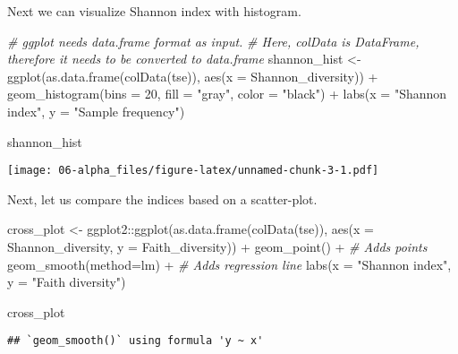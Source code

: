 \documentclass[
  oneside]{book}
\newenvironment{Shaded}{\begin{snugshade}}{\end{snugshade}}
\newcommand{\AttributeTok}[1]{\textcolor[rgb]{0.77,0.63,0.00}{#1}}
\newcommand{\CommentTok}[1]{\textcolor[rgb]{0.56,0.35,0.01}{\textit{#1}}}
\newcommand{\DecValTok}[1]{\textcolor[rgb]{0.00,0.00,0.81}{#1}}
\newcommand{\FunctionTok}[1]{\textcolor[rgb]{0.00,0.00,0.00}{#1}}
\newcommand{\NormalTok}[1]{#1}
\newcommand{\OtherTok}[1]{\textcolor[rgb]{0.56,0.35,0.01}{#1}}
\newcommand{\SpecialCharTok}[1]{\textcolor[rgb]{0.00,0.00,0.00}{#1}}
\newcommand{\StringTok}[1]{\textcolor[rgb]{0.31,0.60,0.02}{#1}}
\begin{document}
Next we can visualize Shannon index with histogram.

\begin{Shaded}
\begin{Highlighting}[]
\CommentTok{\# ggplot needs data.frame format as input.}
\CommentTok{\# Here, colData is DataFrame, therefore it needs to be converted to data.frame}
\NormalTok{shannon\_hist }\OtherTok{\textless{}{-}} \FunctionTok{ggplot}\NormalTok{(}\FunctionTok{as.data.frame}\NormalTok{(}\FunctionTok{colData}\NormalTok{(tse)), }
                       \FunctionTok{aes}\NormalTok{(}\AttributeTok{x =}\NormalTok{ Shannon\_diversity)) }\SpecialCharTok{+} 
  \FunctionTok{geom\_histogram}\NormalTok{(}\AttributeTok{bins =} \DecValTok{20}\NormalTok{, }\AttributeTok{fill =} \StringTok{"gray"}\NormalTok{, }\AttributeTok{color =} \StringTok{"black"}\NormalTok{) }\SpecialCharTok{+}
  \FunctionTok{labs}\NormalTok{(}\AttributeTok{x =} \StringTok{"Shannon index"}\NormalTok{, }\AttributeTok{y =} \StringTok{"Sample frequency"}\NormalTok{)}

\NormalTok{shannon\_hist}
\end{Highlighting}
\end{Shaded}

\texttt{[image: 06-alpha\_files/figure-latex/unnamed-chunk-3-1.pdf]}

Next, let us compare the indices based on a scatter-plot.

\begin{Shaded}
\begin{Highlighting}[]
\NormalTok{cross\_plot }\OtherTok{\textless{}{-}}\NormalTok{ ggplot2}\SpecialCharTok{::}\FunctionTok{ggplot}\NormalTok{(}\FunctionTok{as.data.frame}\NormalTok{(}\FunctionTok{colData}\NormalTok{(tse)), }
                                     \FunctionTok{aes}\NormalTok{(}\AttributeTok{x =}\NormalTok{ Shannon\_diversity, }\AttributeTok{y =}\NormalTok{ Faith\_diversity)) }\SpecialCharTok{+} 
  \FunctionTok{geom\_point}\NormalTok{() }\SpecialCharTok{+} \CommentTok{\# Adds points}
  \FunctionTok{geom\_smooth}\NormalTok{(}\AttributeTok{method=}\NormalTok{lm) }\SpecialCharTok{+} \CommentTok{\# Adds regression line}
  \FunctionTok{labs}\NormalTok{(}\AttributeTok{x =} \StringTok{"Shannon index"}\NormalTok{, }\AttributeTok{y =} \StringTok{"Faith diversity"}\NormalTok{) }

\NormalTok{cross\_plot}
\end{Highlighting}
\end{Shaded}

\begin{verbatim}
## `geom_smooth()` using formula 'y ~ x'
\end{verbatim}
\end{document}
